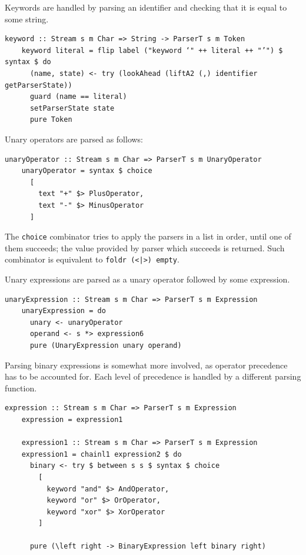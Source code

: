 \documentclass[UdineBachThesis,american,11pt]{PhdThesis}
\begin{document}
  Keywords are handled by parsing an identifier and checking that it is equal to
  some string.

  \begin{Verbatim}[gobble=4,fontsize=\small]
    keyword :: Stream s m Char => String -> ParserT s m Token
    keyword literal = flip label ("keyword ‘" ++ literal ++ "’") $ syntax $ do
      (name, state) <- try (lookAhead (liftA2 (,) identifier getParserState))
      guard (name == literal)
      setParserState state
      pure Token
  \end{Verbatim}

  Unary operators are parsed as follows:

  \begin{Verbatim}[gobble=4,fontsize=\small]
    unaryOperator :: Stream s m Char => ParserT s m UnaryOperator
    unaryOperator = syntax $ choice
      [
        text "+" $> PlusOperator,
        text "-" $> MinusOperator
      ]
  \end{Verbatim}

  The \mbox{\texttt{choice}} combinator tries to apply the parsers in a list in
  order, until one of them succeeds; the value provided by parser which succeeds
  is returned. Such combinator is equivalent to
  \mbox{\texttt{foldr (<|>) empty}}.

  Unary expressions are parsed as a unary operator followed by some expression.

  \begin{Verbatim}[gobble=4,fontsize=\small]
    unaryExpression :: Stream s m Char => ParserT s m Expression
    unaryExpression = do
      unary <- unaryOperator
      operand <- s *> expression6
      pure (UnaryExpression unary operand)
  \end{Verbatim}

  Parsing binary expressions is somewhat more involved, as operator precedence
  has to be accounted for. Each level of precedence is handled by a different
  parsing function.

  \begin{Verbatim}[gobble=4,fontsize=\small]
    expression :: Stream s m Char => ParserT s m Expression
    expression = expression1

    expression1 :: Stream s m Char => ParserT s m Expression
    expression1 = chainl1 expression2 $ do
      binary <- try $ between s s $ syntax $ choice
        [
          keyword "and" $> AndOperator,
          keyword "or" $> OrOperator,
          keyword "xor" $> XorOperator
        ]

      pure (\left right -> BinaryExpression left binary right)
  \end{Verbatim}
\end{document}
